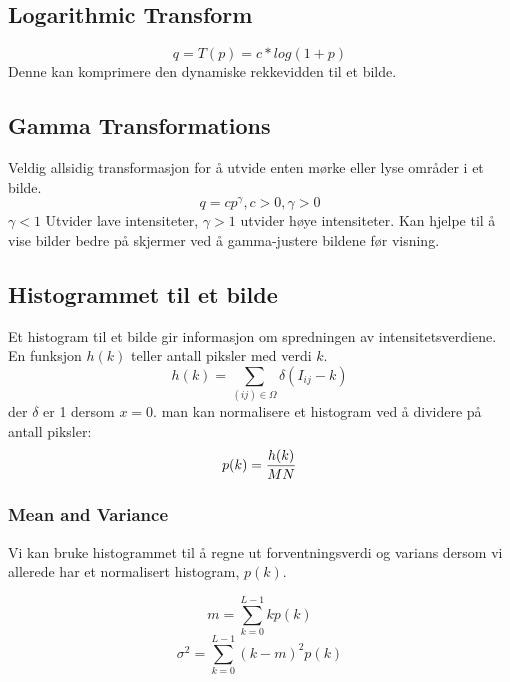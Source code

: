 \subsection{Logarithmic Transform}
\begin{equation}
    q = T(p) = c*log(1+p)
\end{equation}
Denne kan komprimere den dynamiske rekkevidden til et bilde.

\subsection{Gamma Transformations}
Veldig allsidig transformasjon for å utvide enten mørke eller lyse områder i et bilde.
\begin{equation}
    q = cp^\gamma, c > 0, \gamma > 0
\end{equation}
$\gamma < 1$ Utvider lave intensiteter, $\gamma > 1$ utvider høye intensiteter. Kan hjelpe til å vise bilder bedre på skjermer ved å gamma-justere bildene før visning.

\subsection{Histogrammet til et bilde}
Et histogram til et bilde gir informasjon om spredningen av intensitetsverdiene. En funksjon $h(k)$ teller antall piksler med verdi $k$.
\begin{equation}
    h(k) = \sum_{(ij) \in  \Omega} \delta (I_{ij} - k)
\end{equation}
der $\delta$ er 1 dersom $x=0$. man kan normalisere et histogram ved å dividere på antall piksler:
\begin{equation}
    p(k) = {h(k) \over MN}
\end{equation}

\subsubsection{Mean and Variance}
Vi kan bruke histogrammet til å regne ut forventningsverdi og varians dersom vi allerede har et normalisert histogram, $p(k)$.

\begin{equation}
    m = \sum_{k=0}^{L-1} k p(k)
\end{equation}
\begin{equation}
    \sigma^2 = \sum_{k=0}^{L-1} (k-m)^2 p(k)
\end{equation}

